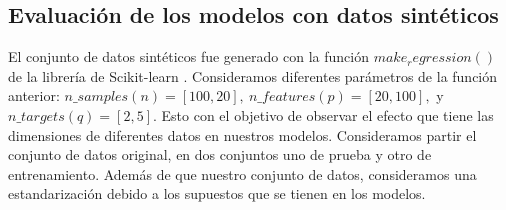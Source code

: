 \documentclass{article}
\begin{document}
\subsection{Evaluación de los modelos con datos sintéticos}
El conjunto de datos sintéticos fue generado con la función $make_regression()$ de la librería de Scikit-learn \citep{scikit-learn}. Consideramos diferentes parámetros de la función anterior: $n\_samples (n)=[100,20],\  n\_features(p)=[20,100],$ y $ n\_targets(q)=[2,5]$. Esto con el objetivo de observar el efecto que tiene las dimensiones de diferentes datos en nuestros modelos. Consideramos partir el conjunto de datos original, en dos conjuntos uno de prueba y otro de entrenamiento. Además de que nuestro conjunto de datos, consideramos una estandarización debido a los supuestos que se tienen en los modelos.
\end{document}
